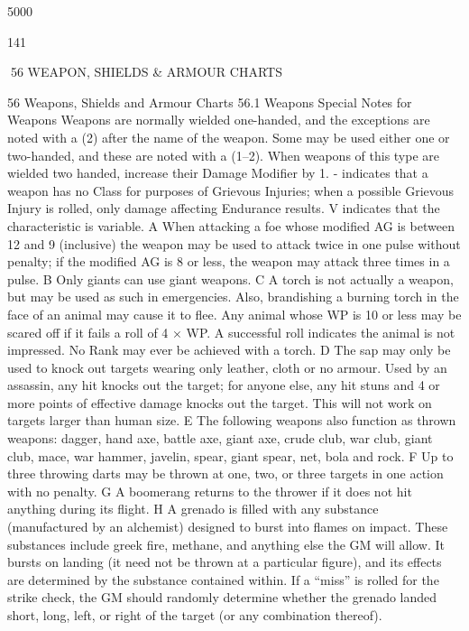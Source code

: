 \documentclass[a4paper]{article}
\begin{document}
\begin{multicols}{3}
5000

141

56 WEAPON, SHIELDS & ARMOUR CHARTS

56 Weapons, Shields and Armour Charts
56.1 Weapons
Special Notes for Weapons
Weapons are normally wielded one-handed, and
the exceptions are noted with a (2) after the name
of the weapon. Some may be used either one or
two-handed, and these are noted with a (1–2).
When weapons of this type are wielded two
handed, increase their Damage Modifier by 1.
- indicates that a weapon has no Class for purposes
of Grievous Injuries; when a possible Grievous
Injury is rolled, only damage affecting Endurance
results.
V indicates that the characteristic is variable.
A When attacking a foe whose modified AG is
between 12 and 9 (inclusive) the weapon may be
used to attack twice in one pulse without penalty; if
the modified AG is 8 or less, the weapon may
attack three times in a pulse.
B Only giants can use giant weapons.
C A torch is not actually a weapon, but may be
used as such in emergencies. Also, brandishing a
burning torch in the face of an animal may cause it
to flee. Any animal whose WP is 10 or less may be
scared off if it fails a roll of 4 × WP. A successful
roll indicates the animal is not impressed. No Rank
may ever be achieved with a torch.
D The sap may only be used to knock out targets
wearing only leather, cloth or no armour. Used by
an assassin, any hit knocks out the target; for anyone else, any hit stuns and 4 or more points of
effective damage knocks out the target. This will
not work on targets larger than human size.
E The following weapons also function as thrown
weapons: dagger, hand axe, battle axe, giant axe,
crude club, war club, giant club, mace, war hammer, javelin, spear, giant spear, net, bola and rock.
F Up to three throwing darts may be thrown at one,
two, or three targets in one action with no penalty.
G A boomerang returns to the thrower if it does not
hit anything during its flight.
H A grenado is filled with any substance (manufactured by an alchemist) designed to burst into
flames on impact. These substances include greek
fire, methane, and anything else the GM will allow.
It bursts on landing (it need not be thrown at a
particular figure), and its effects are determined by
the substance contained within. If a “miss” is rolled
for the strike check, the GM should randomly
determine whether the grenado landed short, long,
left, or right of the target (or any combination
thereof).


\end{multicols}
\end{document}
